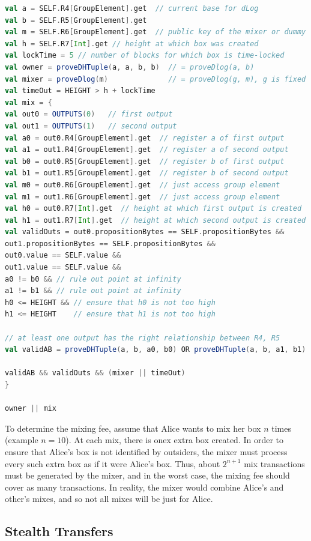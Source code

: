 \documentclass[runningheads]{llncs}
\begin{document}
\begin{lstlisting}[language=Scala,caption={Mix-script with Outsourceability},label=mixScript]
val a = SELF.R4[GroupElement].get  // current base for dLog
val b = SELF.R5[GroupElement].get
val m = SELF.R6[GroupElement].get  // public key of the mixer or dummy value
val h = SELF.R7[Int].get // height at which box was created
val lockTime = 5 // number of blocks for which box is time-locked
val owner = proveDHTuple(a, a, b, b)  // = proveDlog(a, b)
val mixer = proveDlog(m)              // = proveDlog(g, m), g is fixed
val timeOut = HEIGHT > h + lockTime
val mix = {
val out0 = OUTPUTS(0)   // first output
val out1 = OUTPUTS(1)   // second output
val a0 = out0.R4[GroupElement].get  // register a of first output
val a1 = out1.R4[GroupElement].get  // register a of second output
val b0 = out0.R5[GroupElement].get  // register b of first output
val b1 = out1.R5[GroupElement].get  // register b of second output
val m0 = out0.R6[GroupElement].get  // just access group element
val m1 = out1.R6[GroupElement].get  // just access group element
val h0 = out0.R7[Int].get  // height at which first output is created
val h1 = out1.R7[Int].get  // height at which second output is created
val validOuts = out0.propositionBytes == SELF.propositionBytes &&
out1.propositionBytes == SELF.propositionBytes &&
out0.value == SELF.value &&
out1.value == SELF.value &&
a0 != b0 && // rule out point at infinity
a1 != b1 && // rule out point at infinity
h0 <= HEIGHT && // ensure that h0 is not too high
h1 <= HEIGHT    // ensure that h1 is not too high

// at least one output has the right relationship between R4, R5
val validAB = proveDHTuple(a, b, a0, b0) OR proveDHTuple(a, b, a1, b1)

validAB && validOuts && (mixer || timeOut)
}

owner || mix
\end{lstlisting}

To determine the mixing fee, assume that Alice wants to mix her box $n$ times (example $n = 10$). At each mix, there is onex extra box created. In order to ensure that Alice's box is not identified by outsiders, the mixer must process every such extra box as if it were Alice's box. Thus, about $2^{n+1}$ mix transactions must be generated by the mixer, and in the worst case, the mixing fee should cover as many transactions. In reality, the mixer would combine Alice's and other's mixes, and so not all mixes will be just for Alice.

\subsection{Stealth Transfers}
\end{document}
